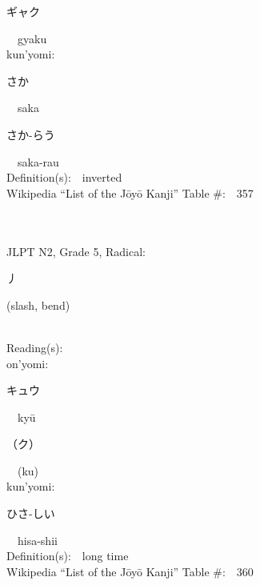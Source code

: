 \begin{multicols}{2}
{\hspace*{2em}}{\begin{CJK}{UTF8}{min} ギャク \end{CJK}}\ \ gyaku\ \ \\
{\hspace*{1em}}kun'yomi:\ \ \\
{\hspace*{2em}}{\begin{CJK}{UTF8}{min} さか \end{CJK}}\ \ saka\ \ \\
{\hspace*{2em}}{\begin{CJK}{UTF8}{min} さか-らう \end{CJK}}\ \ saka-rau\ \ \\
Definition(s):\ \ inverted \\
Wikipedia ``List of the J\=oy\=o Kanji'' Table \#:\ \ 357 \\
\ \ \\
{\fontsize{34pt}{40pt}  }\ \ \\  %
{JLPT N2, Grade 5, Radical:\ \ {\begin{CJK}{UTF8}{min} 丿 \end{CJK}} (slash, bend) } \\
Reading(s):\ \ \\
{\hspace*{1em}}on'yomi:\ \ \\
{\hspace*{2em}}{\begin{CJK}{UTF8}{min} キュウ \end{CJK}}\ \ ky\=u\ \ \\
{\hspace*{2em}}{\begin{CJK}{UTF8}{min} （ク） \end{CJK}}\ \ (ku)\ \ \\
{\hspace*{1em}}kun'yomi:\ \ \\
{\hspace*{2em}}{\begin{CJK}{UTF8}{min} ひさ-しい \end{CJK}}\ \ hisa-shii\ \ \\
Definition(s):\ \ long time \\
Wikipedia ``List of the J\=oy\=o Kanji'' Table \#:\ \ 360 \\

\end{multicols}
